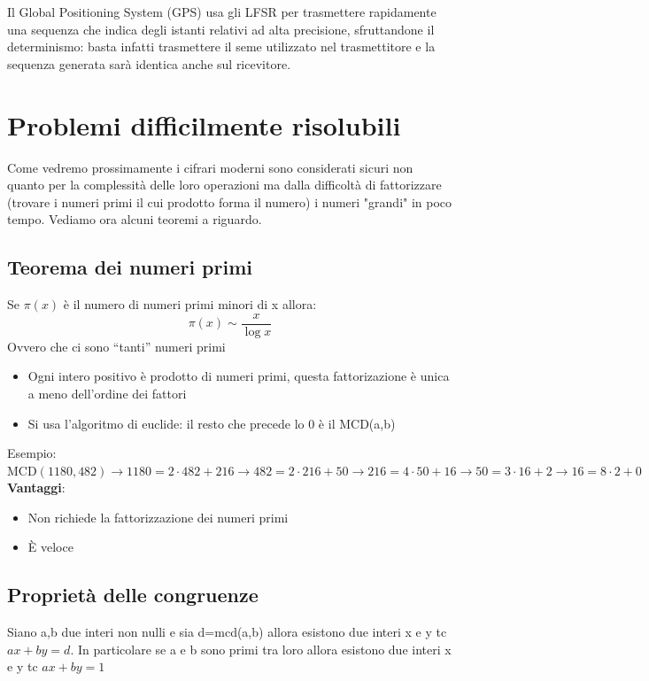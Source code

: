 \documentclass[10pt,a4paper]{article}
\begin{document}
Il Global Positioning System (GPS) usa gli LFSR per trasmettere rapidamente una sequenza che indica degli istanti relativi ad alta precisione, sfruttandone il determinismo: basta infatti trasmettere il seme utilizzato nel trasmettitore e la sequenza generata sarà identica anche sul ricevitore.

\section{Problemi difficilmente risolubili}
Come vedremo prossimamente i cifrari moderni sono considerati sicuri non quanto per la complessità delle loro operazioni ma dalla difficoltà di fattorizzare (trovare i numeri primi il cui prodotto forma il numero) i numeri "grandi" in poco tempo. Vediamo ora alcuni teoremi a riguardo.

\subsection{Teorema dei numeri primi}
Se $\pi(x)$ è il numero di numeri primi minori di x allora:
$$\pi(x) \sim \frac{x}{\log x}$$
Ovvero che ci sono ``tanti'' numeri primi
\begin{itemize}
\item Ogni intero positivo è prodotto di numeri primi, questa fattorizazione è unica a meno dell'ordine dei fattori
\item Si usa l'algoritmo di euclide: il resto che precede lo 0 è il MCD(a,b)
\end{itemize}
Esempio:\\
$\text{MCD} (1180,482) \rightarrow
1180 = 2 \cdot 482+216 \rightarrow
482 = 2 \cdot 216+50 \rightarrow
216 = 4 \cdot 50+16 \rightarrow
50 = 3 \cdot 16+2 \rightarrow
16 = 8 \cdot 2 +0$\\
\textbf{Vantaggi}:
\begin{itemize}
\item Non richiede la fattorizzazione dei numeri primi
\item È veloce
\end{itemize}

\subsection{Proprietà delle congruenze}
Siano a,b due interi non nulli e sia d=mcd(a,b) allora esistono due interi x e y tc $ax+by=d$. In particolare se a e b sono primi tra loro allora esistono due interi x e y tc $ax+by=1$
\end{document}
